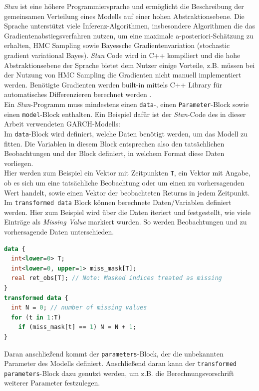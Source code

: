 \documentclass[ngerman]{ttlab-qualify}
\begin{document}
\textit{Stan} ist eine höhere Programmiersprache und ermöglicht die Beschreibung der gemeinsamen Verteilung eines Modells auf einer hohen Abstraktionsebene. Die Sprache unterstützt viele Inferenz-Algorithmen, insbesondere Algorithmen die das Gradientenabstiegsverfahren nutzen, um eine maximale a-posteriori-Schätzung zu erhalten, HMC Sampling sowie Bayessche Gradientenvariation (stochastic gradient variational Bayes). \textit{Stan} Code wird in C++ kompiliert und die hohe Abstraktionsebene der Sprache bietet dem Nutzer einige Vorteile, z.B. müssen bei der Nutzung von HMC Sampling die Gradienten nicht manuell implementiert werden. Benötigte Gradienten werden built-in mittels C++ Library für automatisches Differenzieren berechnet werden \parencite{bertschinger:2018}.\\

Ein \textit{Stan}-Programm muss mindestens einen \verb|data|-, einen \verb|Parameter|-Block sowie einen \verb|model|-Block enthalten.
Ein Beispiel dafür ist der \textit{Stan}-Code des in dieser Arbeit verwendeten GARCH-Modells:\\

Im \verb|data|-Block wird definiert, welche Daten benötigt werden, um das Modell zu fitten. Die Variablen in diesem Block entsprechen also den tatsächlichen Beobachtungen und der Block definiert, in welchem Format diese Daten vorliegen.\\
Hier werden zum Beispiel ein Vektor mit Zeitpunkten \verb|T|, ein Vektor mit Angabe, ob es sich um eine tatsächliche Beobachtung oder um einen zu vorhersagenden Wert handelt, sowie einen Vektor der beobachteten Returns in jedem Zeitpunkt.\\

Im \verb|transformed data| Block können berechnete Daten/Variablen definiert werden. Hier zum Beispiel wird über die Daten iteriert und festgestellt, wie viele Einträge als \textit{Missing Value} markiert wurden. So werden Beobachtungen und zu vorhersagende Daten unterschieden.

\begin{lstlisting}[language=Stan]
data {
  int<lower=0> T;
  int<lower=0, upper=1> miss_mask[T];
  real ret_obs[T]; // Note: Masked indices treated as missing
}
transformed data {
  int N = 0; // number of missing values
  for (t in 1:T)
    if (miss_mask[t] == 1) N = N + 1;
}

\end{lstlisting}

Daran anschließend kommt der \verb|parameters|-Block, der die unbekannten Parameter des Modells definiert. Anschließend daran kann der \verb|transformed parameters|-Block dazu genutzt werden, um z.B. die Berechnungsvorschrift weiterer Parameter festzulegen.\\
\end{document}
